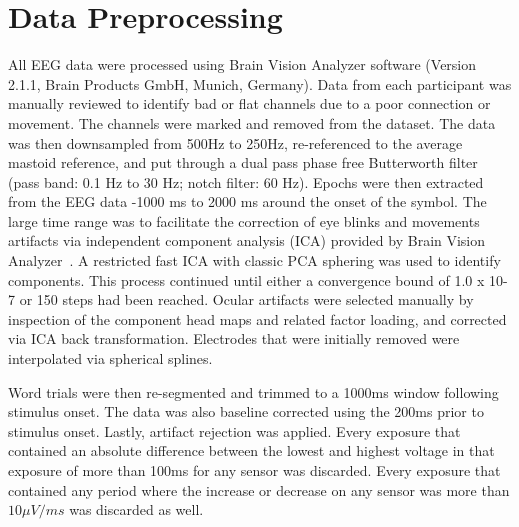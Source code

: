 \section{Data Preprocessing}
\label{sec:preprocessing}
All EEG data were processed using Brain Vision Analyzer software (Version 2.1.1, Brain Products GmbH, Munich, Germany). Data from each participant was manually reviewed to identify bad or flat channels due to a poor connection or movement. The channels were marked and removed from the dataset. The data was then downsampled from 500Hz to 250Hz, re-referenced to the average mastoid reference, and put through a dual pass phase free Butterworth filter (pass band: 0.1 Hz to 30 Hz; notch filter: 60 Hz). Epochs were then extracted from the EEG data -1000 ms to 2000 ms around the onset of the symbol. The large time range was to facilitate the correction of eye blinks and movements artifacts via independent component analysis (ICA) provided by Brain Vision Analyzer~\cite{luck2014introduction}. A restricted fast ICA with classic PCA sphering was used to identify components. This process continued until either a convergence bound of 1.0 x 10-7 or 150 steps had been reached. Ocular artifacts were selected manually by inspection of the component head maps and related factor loading, and corrected via ICA back transformation. Electrodes that were initially removed were interpolated via spherical splines. 

Word trials were then re-segmented and trimmed to a 1000ms window following stimulus onset. The data was also baseline corrected using the 200ms prior to stimulus onset. Lastly, artifact rejection was applied. Every exposure that contained an absolute difference between the lowest and highest voltage in that exposure of more than 100ms for any sensor was discarded. Every exposure that contained any period where the increase or decrease on any sensor was more than $10{\mu}V/ms$ was discarded as well.
